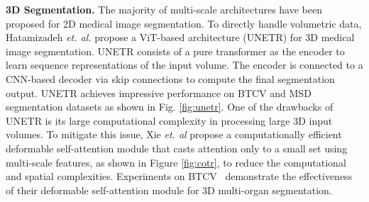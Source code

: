 \documentclass[10pt,journal,compsoc]{IEEEtran}
\begin{document}
\textbf{3D Segmentation.}
The majority of multi-scale architectures have been proposed for 2D medical image segmentation. To directly handle volumetric data, Hatamizadeh \textit{et. al.} \cite{hatamizadeh2021unetr} propose a ViT-based architecture (UNETR) for 3D medical image segmentation. UNETR consists of a pure transformer as the encoder to learn sequence representations of the input volume. The encoder is connected to a CNN-based decoder via skip connections to compute the final segmentation output.
UNETR achieves impressive performance on BTCV \cite{landman2015miccai} and MSD~\cite{simpson2019large} segmentation datasets as shown in Fig. \ref{fig:unetr}.
One of the drawbacks of UNETR is its large computational complexity in processing large 3D input volumes. To mitigate this issue, Xie \textit{et. al} \cite{xie2021cotr} propose a computationally efficient %
deformable self-attention module \cite{dai2017deformable}  that casts attention only to a small set using multi-scale features, as shown in Figure \ref{fig:cotr}, to reduce the computational and spatial complexities. Experiments on BTCV~\cite{landman2015miccai} demonstrate the effectiveness of their deformable self-attention module for 3D multi-organ segmentation. %
\end{document}
